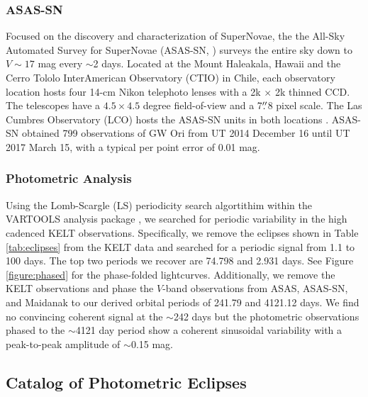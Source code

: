 \documentclass[twocolumn]{aastex61}
\begin{document}
\subsubsection{ASAS-SN}
Focused on the discovery and characterization of SuperNovae, the the All-Sky Automated Survey for SuperNovae (ASAS-SN, \citet{Shappee14}) surveys the entire sky down to $V \sim 17$ mag every $\sim$2 days. Located at the Mount Haleakala, Hawaii and the Cerro Tololo InterAmerican Observatory (CTIO) in Chile, each observatory location hosts four 14-cm Nikon telephoto lenses with a 2k $\times$ 2k thinned CCD. The telescopes have a $4.5\times4.5$ degree field-of-view and a 7$\mbox{$.\!\!^{\prime\prime}$}$8 pixel scale. The Las Cumbres Observatory (LCO) hosts the ASAS-SN units in both locations \citep{Brown13}. ASAS-SN obtained 799 observations of GW Ori from UT 2014 December 16 until UT 2017 March 15, with a typical per point error of 0.01 mag.

\subsubsection{Photometric Analysis}
Using the Lomb-Scargle (LS) periodicity search algortithim \citep{Lomb76,Scargle82} within the VARTOOLS analysis package \citep{Hartman:12}, we searched for periodic variability in the high cadenced KELT observations. Specifically, we remove the eclipses shown in Table \ref{tab:eclipses} from the KELT data and searched for a periodic signal from 1.1 to 100 days. The top two periods we recover are 74.798 and 2.931 days. See Figure \ref{figure:phased} for the phase-folded lightcurves. Additionally, we remove the KELT observations and phase the $V$-band observations from ASAS, ASAS-SN, and Maidanak to our derived orbital periods of 241.79 and 4121.12 days. We find no convincing coherent signal at the $\sim$242 days but the photometric observations phased to the $\sim$4121 day period show a coherent sinusoidal variability with a peak-to-peak amplitude of $\sim$0.15 mag.



\subsection{Catalog of Photometric Eclipses}
\end{document}
